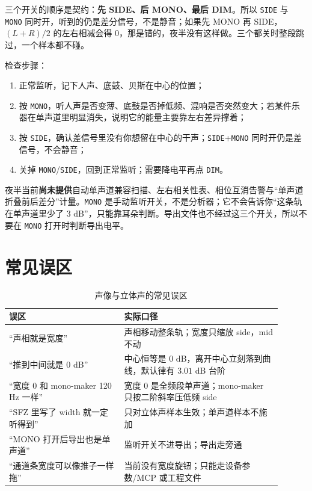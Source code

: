 三个开关的顺序是契约：\textbf{先 SIDE、后 MONO、最后 DIM}。所以 \texttt{SIDE} 与 \texttt{MONO} 同时开，听到的仍是差分信号，不是静音；如果先 MONO 再 SIDE，$(L+R)/2$ 的左右相减会得 0，那是错的，夜半没有这样做。三个都关时整段跳过，一个样本都不碰。

检查步骤：

\begin{enumerate}
  \item 正常监听，记下人声、底鼓、贝斯在中心的位置；
  \item 按 \texttt{MONO}，听人声是否变薄、底鼓是否掉低频、混响是否突然变大；若某件乐器在单声道里明显消失，说明它的能量主要靠左右差异撑着；
  \item 按 \texttt{SIDE}，确认差信号里没有你想留在中心的干声；\texttt{SIDE}+\texttt{MONO} 同时开仍是差信号，不会静音；
  \item 关掉 \texttt{MONO}/\texttt{SIDE}，回到正常监听；需要降电平再点 \texttt{DIM}。
\end{enumerate}

夜半当前\textbf{尚未提供}自动单声道兼容扫描、左右相关性表、相位互消告警与“单声道折叠前后差分”计量。\texttt{MONO} 是手动监听开关，不是分析器；它不会告诉你“这条轨在单声道里少了 3 dB”，只能靠耳朵判断。导出文件也不经过这三个开关，所以不要在 \texttt{MONO} 打开时判断导出电平。

\section{常见误区}

\begin{table}[htbp]
\centering
\small
\begin{tabular}{@{}p{0.38\linewidth}p{0.52\linewidth}@{}}
\hline
误区 & 实际口径 \\
\hline
“声相就是宽度” & 声相移动整条轨；宽度只缩放 side，mid 不动 \\
“推到中间就是 0 dB” & 中心恒等是 $0$ dB，离开中心立刻落到曲线，默认律有 $3.01$ dB 台阶 \\
“宽度 0 和 mono-maker 120 Hz 一样” & 宽度 0 是全频段单声道；mono-maker 只按二阶斜率压低频 side \\
“SFZ 里写了 width 就一定听得到” & 只对立体声样本生效；单声道样本不施加 \\
“MONO 打开后导出也是单声道” & 监听开关不进导出；导出走旁通 \\
“通道条宽度可以像推子一样拖” & 当前没有宽度旋钮；只能走设备参数/MCP 或工程文件 \\
\hline
\end{tabular}
\caption{声像与立体声的常见误区}
\label{tab:stereo-mistakes}
\end{table}

